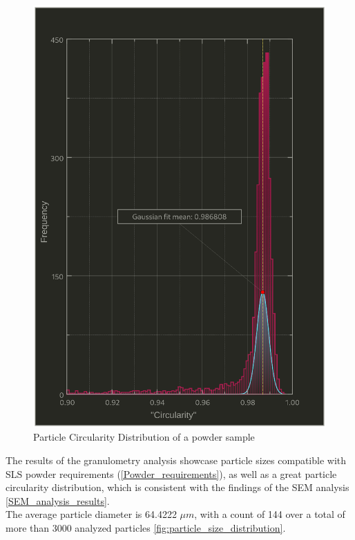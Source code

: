 \documentclass{article}
\begin{document}
        \begin{figure}[h!]
            \centering
            \includegraphics[width=\textwidth]{Pictures/Granulometry_plots/Histogram_Circularity.eps}
            \caption{Particle Circularity Distribution of a powder sample}
            \label{fig:circularity_distribution}
        \end{figure}
  
      \clearpage
  
      The results of the granulometry analysis showcase particle sizes compatible with SLS powder requirements (\ref{Powder_requirements}), 
      as well as a great particle circularity distribution, which is consistent with the findings of the 
      SEM analysis \ref{SEM_analysis_results}. \\
  
      The average particle diameter is 64.4222 $\mu m$, with a count of 144 over a total of more 
      than 3000 analyzed particles \ref{fig:particle_size_distribution}. \\ 
  
\end{document}

